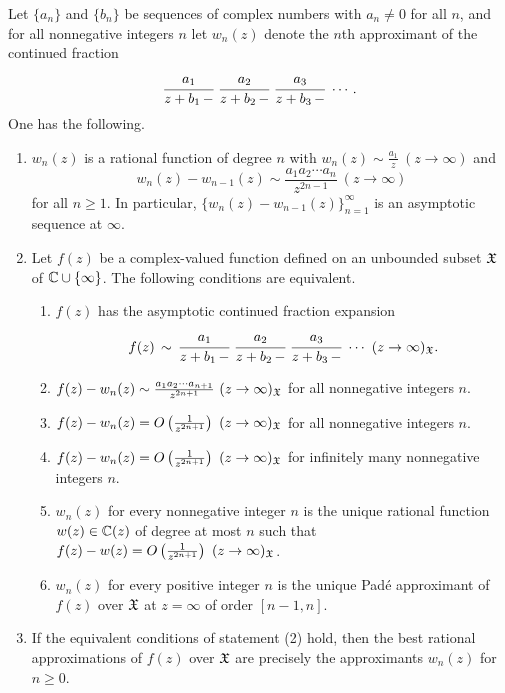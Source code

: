 \documentclass[12pt]{article}
\begin{document}
\begin{theorem}\label{wsimJ}
Let $\{a_n\}$ and $\{b_n\}$ be sequences of complex numbers with $a_n \neq 0$ for all $n$, and for all nonnegative integers $n$ let $w_n(z)$ denote the $n$th approximant of the continued fraction
\begin{eqnarray*}
\cfrac{a_1}{z+b_1 \,-} \  \cfrac{a_2}{z+b_2 \,-} \  \cfrac{a_3}{z+b_3 \,-} \ \cdots.
\end{eqnarray*}
One has the following.
\begin{enumerate}
\item $w_n(z)$ is a rational function of degree $n$  with $w_n(z) \sim \frac{a_1}{z}  \ (z \to \infty)$ and $$w_n(z)-w_{n-1}(z) \sim \frac{a_1 a_2 \cdots a_n}{z^{2n-1}}  \ (z \to \infty)$$ for all $n \geq 1$.  In particular, $\{w_n(z)-w_{n-1}(z)\}_{n = 1}^\infty$ is an asymptotic sequence at $\infty$.
\item  Let $f(z)$ be a complex-valued function defined on an unbounded subset ${\mathfrak X}$ of ${\mathbb C} \cup \{\infty\}$.  The following conditions are equivalent.
\begin{enumerate}
\item $f(z)$  has the asymptotic continued fraction expansion
\begin{eqnarray*}
f(z) \, \sim \, \cfrac{a_1}{z+b_1 \,-} \  \cfrac{a_2}{z+b_2 \,-} \  \cfrac{a_3}{z+b_3 \,-} \ \cdots  \ (z \to \infty)_{\mathfrak X}.
\end{eqnarray*}
\item $f(z) - w_n(z) \sim  \frac{a_1 a_2 \cdots a_{n+1}}{z^{2n+1}} \ (z \to \infty)_{\mathfrak X}$ for all  nonnegative integers $n$.
\item $f(z) - w_n(z) = O\left(\frac{1}{z^{2n+1}} \right) \ (z \to \infty)_{\mathfrak X}$ for all nonnegative integers $n$.
\item $f(z) - w_n(z) = O\left(\frac{1}{z^{2n+1}} \right) \ (z \to \infty)_{\mathfrak X}$ for infinitely many nonnegative integers $n$.
\item $w_n(z)$ for every nonnegative integer $n$ is the unique rational function  $w(z) \in {\mathbb C}(z)$ of degree at most $n$ such that $f(z) - w(z) = O\left(\frac{1}{z^{2n+1}} \right) \ (z \to \infty)_{\mathfrak X}$.
\item $w_n(z)$ for every positive integer $n$ is the unique Pad\'e approximant of $f(z)$ over ${\mathfrak X}$  at $z = \infty$ of order $[n-1,n]$. 
\end{enumerate}
\item If the equivalent conditions of statement (2) hold, then the best rational approximations of $f(z)$ over ${\mathfrak X}$ are precisely the approximants $w_n(z)$ for $n \geq 0$.
\end{enumerate}
\end{theorem}
\end{document}
